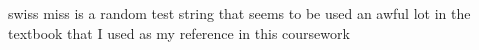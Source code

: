 swiss miss is a random test string that seems to be used
an awful lot in the textbook that I used as my reference
in this coursework

